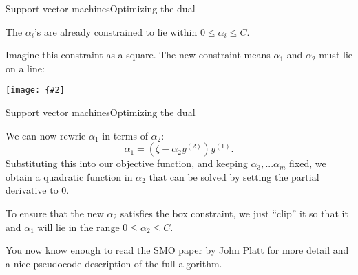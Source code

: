 \documentclass{beamer}
\newcommand{\myfig}[3]{\centerline{\texttt{[image: \{\#2]}}}
    \centerline{\scriptsize #3}}
\begin{document}
\begin{frame}{Support vector machines}{Optimizing the dual}

  The $\alpha_i$'s are already constrained to lie within $0 \le \alpha_i \le C$.

  \medskip

  Imagine this constraint as a square. The new constraint means $\alpha_1$ and
  $\alpha_2$ must lie on a line:

  \medskip

  \myfig{2.5in}{ng-smo-constraints}{Ng, CS 229 lecture notes set 3}
  
\end{frame}


\begin{frame}{Support vector machines}{Optimizing the dual}

  We can now rewrie $\alpha_1$ in terms of $\alpha_2$:
  \[ \alpha_1 = (\zeta-\alpha_2y^{(2)})y^{(1)}. \]
  Substituting this into our objective function, and keeping
  $\alpha_3,...\alpha_m$ fixed, we obtain a quadratic function in
  $\alpha_2$ that can be solved by setting the partial derivative to
  0.

  \medskip

  To ensure that the new $\alpha_2$ satisfies the box constraint, we
  just ``clip'' it so that it and $\alpha_1$ will lie in the range $0
  \le \alpha_2 \le C$.

  \medskip

  You now know enough to read the SMO paper by John Platt for more detail
  and a nice pseudocode description of the full algorithm.
  
\end{frame}
\end{document}
